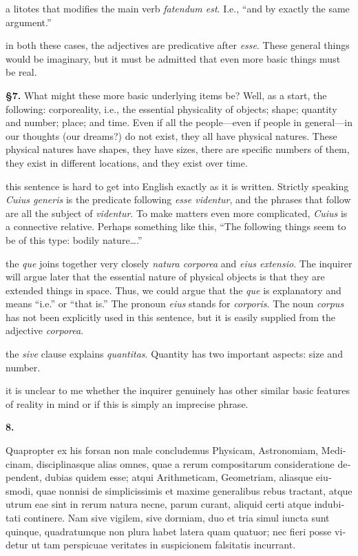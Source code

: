  a litotes that modifies the main verb \textit{fatendum est}. I.e., ``and by exactly the same argument.''

 in both these cases, the adjectives are predicative after \textit{esse}. These general things would be imaginary, but it must be admitted that even more basic things must be real.

\textbf{§7.} What might these more basic underlying items be? Well, as a start, the following: corporeality, i.e., the essential physicality of objects; shape; quantity and number; place; and time. Even if all the people---even if people in general---in our thoughts (our dreams?) do not exist, they all have physical natures. These physical natures have shapes, they have sizes, there are specific numbers of them, they exist in different locations, and they exist over time.

 this sentence is hard to get into English exactly as it is written. Strictly speaking \textit{Cuius generis} is the predicate following \textit{esse videntur}, and the phrases that follow are all the subject of \textit{videntur}. To make matters even more complicated, \textit{Cuius} is a connective relative. Perhaps something like this, ``The following things seem to be of this type: bodily nature\dots.''

 the \textit{que} joins together very closely \textit{natura corporea} and \textit{eius extensio}. The inquirer will argue later that the essential nature of physical objects is that they are extended things in space. Thus, we could argue that the \textit{que} is explanatory and means ``i.e.'' or ``that is.'' The pronoun \textit{eius} stands for \textit{corporis}. The noun \textit{corpus} has not been explicitly used in this sentence, but it is easily supplied from the adjective \textit{corporea}.

 the \textit{sive} clause explains \textit{quantitas}. Quantity has two important aspects: size and number.

 it is unclear to me whether the inquirer genuinely has other similar basic features of reality in mind or if this is simply an imprecise phrase.

\clearpage

\beginnumbering
\pstart
\textbf{8.} \begin{latin}Quapropter ex his forsan non male concludemus Physicam, Astronomiam, Medicinam, disciplinasque alias omnes, quae a rerum compositarum consideratione dependent, dubias quidem esse; atqui Arithmeticam, Geometriam, aliasque eiusmodi, quae nonnisi de simplicissimis et maxime generalibus rebus tractant, atque utrum eae sint in rerum natura necne, parum curant, aliquid certi atque indubitati continere. Nam sive vigilem, sive dormiam, duo et tria simul iuncta sunt quinque, quadratumque non plura habet latera quam quatuor; nec fieri posse videtur ut tam perspicuae veritates in suspicionem falsitatis incurrant.\end{latin}
\pend
\endnumbering

